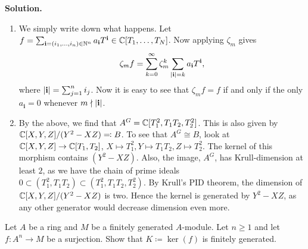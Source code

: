 \documentclass[a4paper,11pt]{article}
\begin{document}
\textbf{Solution.}
\begin{enumerate}
    \item We simply write down what happens. Let $f = \sum_{\mathbf i = (i_1, \dots, i_n) \in \mathbb{N}^n} a_{\mathbf i}T^{\mathbf i} \in \mathbb{C}[T_1, \dots, T_N]$. Now applying
        $\zeta_m$ gives 
        \begin{equation*}
            \zeta_m f = \sum_{k = 0}^\infty \zeta_m^{k}
            \sum_{\left\lvert \mathbf i \right\rvert= k} a_{\mathbf i}T^{\mathbf i},
        \end{equation*}
        where $\left\lvert \mathbf i \right\rvert = \sum_{j=1}^n i_j$. Now it is easy to see that 
        $\zeta_m f = f$ if and only if the only $a_{\mathbf i} = 0$ 
        whenever $m \nmid \left\lvert \mathbf i \right\rvert$. 
    \item By the above, we find that $A^G = \mathbb{C}[T_1^2, T_1T_2, T_2^2]$. 
        This is also given by $\mathbb{C}[X,Y,Z]/(Y^2 - XZ) \eqqcolon B$. To see 
        that $A^G \cong B$, look at 
        $\mathbb{C}[X,Y,Z] \to \mathbb{C}[T_1, T_2]$, $X \mapsto T_1^2, Y \mapsto T_1T_2, 
        Z \mapsto T_2^2$. The kernel of this morphism contains
        $(Y^2 - XZ)$. Also, the image, $A^G$, has Krull-dimension at least $2$, 
        as we have the chain of prime ideals $0 \subset (T_1^2, T_1T_2)
        \subset (T_1^2, T_1T_2, T_2^2)$. By Krull's PID theorem, the dimension
        of $\mathbb{C}[X,Y,Z]/(Y^2-XZ)$ is two. Hence the kernel is generated by 
        $Y^2-XZ$, as any other generator would decrease dimension even more.
\end{enumerate}


Let $A$ be a ring and $M$ be a finitely generated $A$-module. Let $n \geq 1$
and let $f: A^n \to M$ be a surjection. Show that $K \coloneqq \ker(f)$
is finitely generated.
\end{document}

